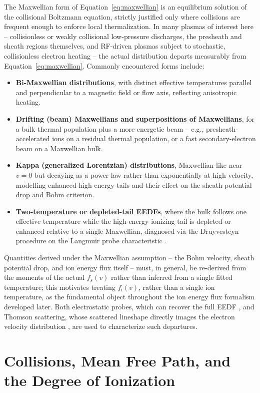 The Maxwellian form of Equation~\eqref{eq:maxwellian} is an equilibrium solution of the collisional Boltzmann equation, strictly justified only where collisions are frequent enough to enforce local thermalization. In many plasmas of interest here -- collisionless or weakly collisional low-pressure discharges, the presheath and sheath regions themselves, and RF-driven plasmas subject to stochastic, collisionless electron heating -- the actual distribution departs measurably from Equation~\eqref{eq:maxwellian}. Commonly encountered forms include:
\begin{itemize}
\item \textbf{Bi-Maxwellian distributions}, with distinct effective temperatures parallel and perpendicular to a magnetic field or flow axis, reflecting anisotropic heating.
\item \textbf{Drifting (beam) Maxwellians and superpositions of Maxwellians}, for a bulk thermal population plus a more energetic beam -- e.g., presheath-accelerated ions on a residual thermal population, or a fast secondary-electron beam on a Maxwellian bulk.
\item \textbf{Kappa (generalized Lorentzian) distributions}, Maxwellian-like near $v = 0$ but decaying as a power law rather than exponentially at high velocity, modelling enhanced high-energy tails and their effect on the sheath potential drop and Bohm criterion.
\item \textbf{Two-temperature or depleted-tail EEDFs}, where the bulk follows one effective temperature while the high-energy ionizing tail is depleted or enhanced relative to a single Maxwellian, diagnosed via the Druyvesteyn procedure on the Langmuir probe characteristic \cite{ref0213,ref0217}.
\end{itemize}
Quantities derived under the Maxwellian assumption -- the Bohm velocity, sheath potential drop, and ion energy flux itself -- must, in general, be re-derived from the moments of the actual $f_{s}(v)$ rather than inferred from a single fitted temperature; this motivates treating $f_{\mathrm{i}}(v)$, rather than a single ion temperature, as the fundamental object throughout the ion energy flux formalism developed later. Both electrostatic probes, which can recover the full EEDF \cite{ref0194,ref0226}, and Thomson scattering, whose scattered lineshape directly images the electron velocity distribution \cite{ref0354,ref0384}, are used to characterize such departures.

\section{Collisions, Mean Free Path, and the Degree of Ionization}
\label{sec:collisions}

